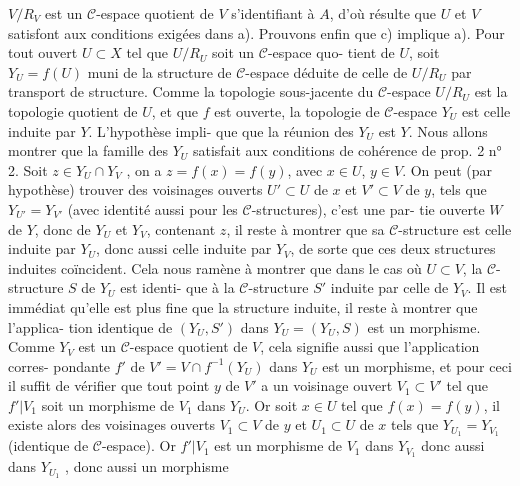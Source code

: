 $V/R_V$ est un $\mathcal{C}$-espace quotient de $V$ s'identifiant à $A$, d'où résulte que
$U$ et $V$ satisfont aux conditions exigées dans a). Prouvons enfin que c)
implique a). Pour tout ouvert $U \subset X$ tel que $U/R_U$ soit un $\mathcal{C}$-espace quo-
tient de $U$, soit $Y_U = f(U)$ muni de la structure de $\mathcal{C}$-espace déduite de
celle de $U/R_U$ par transport de structure. Comme la topologie sous-jacente
du $\mathcal{C}$-espace $U/R_U$ est la topologie quotient de $U$, et que $f$ est ouverte,
la topologie de $\mathcal{C}$-espace $Y_U$ est celle induite par $Y$. L'hypothèse impli-
que que la réunion des $Y_U$ est $Y$. Nous allons montrer que la famille des
$Y_U$ satisfait aux conditions de cohérence de prop. 2 n° 2. Soit
$z \in Y_U \cap Y_V$ , on a $z = f(x) = f(y)$, avec $x \in U$, $y \in V$. On peut (par hypothèse)
trouver des voisinages ouverts $U' \subset U$ de $x$ et $V' \subset V$ de $y$, tels que
$Y_{U'} = Y_{V'}$ (avec identité aussi pour les $\mathcal{C}$-structures), c'est une par-
tie ouverte $W$ de $Y$, donc de $Y_U$ et $Y_V$, contenant $z$, il reste à montrer que
sa $\mathcal{C}$-structure est celle induite par $Y_U$, donc aussi celle induite par
$Y_V$, de sorte que ces deux structures induites coïncident. Cela nous ramène
à montrer que dans le cas où $U \subset V$, la $\mathcal{C}$-structure $S$ de $Y_U$ est identi-
que à la $\mathcal{C}$-structure $S'$ induite par celle de $Y_V$. Il est immédiat qu'elle
est plus fine que la structure induite, il reste à montrer que l'applica-
tion identique de $(Y_U,S')$ dans $Y_U = (Y_U,S)$ est un morphisme. Comme $Y_V$ est
un $\mathcal{C}$-espace quotient de $V$, cela signifie aussi que l'application corres-
pondante $f'$ de $V' = V \cap f^{-1}(Y_U)$ dans $Y_U$ est un morphisme, et pour ceci
il suffit de vérifier que tout point $y$ de $V'$ a un voisinage ouvert
$V_1 \subset V'$ tel que $f'|V_1$ soit un morphisme de $V_1$ dans $Y_U$. Or soit $x \in U$ tel
que $f(x) = f(y)$, il existe alors des voisinages ouverts $V_1 \subset V$ de $y$ et
$U_1 \subset U$ de $x$ tels que $Y_{U_1} = Y_{V_1}$ (identique de $\mathcal{C}$-espace). Or $f'|V_1$ est
un morphisme de $V_1$ dans $Y_{V_1}$ donc aussi dans $Y_{U_1}$ , donc aussi un morphisme

\newpage


